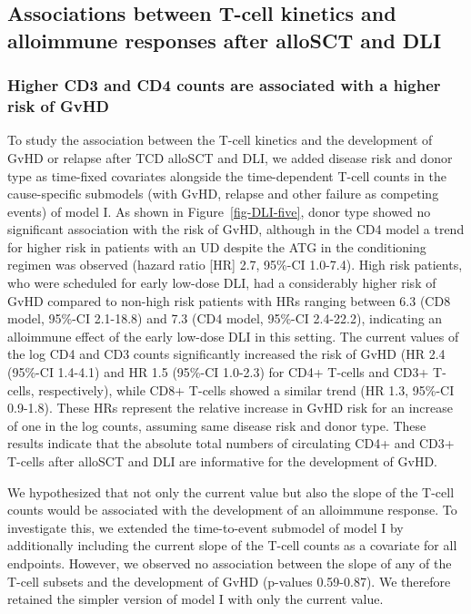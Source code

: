 \documentclass[
  letterpaper,
  paper=240mm:170mm,
  twoside=true,
  open=right,
  fontsize=10pt,
  pagesize=false,
  BCOR=15mm,
  DIV=14,
  headinclude=true,
  footinclude=false,
  headsepline=on]{scrbook}
\begin{document}
\subsection{Associations between T-cell kinetics and alloimmune
responses after alloSCT and
DLI}\label{associations-between-t-cell-kinetics-and-alloimmune-responses-after-allosct-and-dli}

\subsubsection{Higher CD3 and CD4 counts are associated with a higher
risk of
GvHD}\label{higher-cd3-and-cd4-counts-are-associated-with-a-higher-risk-of-gvhd}

To study the association between the T-cell kinetics and the development
of GvHD or relapse after TCD alloSCT and DLI, we added disease risk and
donor type as time-fixed covariates alongside the time-dependent T-cell
counts in the cause-specific submodels (with GvHD, relapse and other
failure as competing events) of model I. As shown in
Figure~\ref{fig-DLI-five}, donor type showed no significant association
with the risk of GvHD, although in the CD4 model a trend for higher risk
in patients with an UD despite the ATG in the conditioning regimen was
observed (hazard ratio {[}HR{]} 2.7, 95\%-CI 1.0-7.4). High risk
patients, who were scheduled for early low-dose DLI, had a considerably
higher risk of GvHD compared to non-high risk patients with HRs ranging
between 6.3 (CD8 model, 95\%-CI 2.1-18.8) and 7.3 (CD4 model, 95\%-CI
2.4-22.2), indicating an alloimmune effect of the early low-dose DLI in
this setting. The current values of the log CD4 and CD3 counts
significantly increased the risk of GvHD (HR 2.4 (95\%-CI 1.4-4.1) and
HR 1.5 (95\%-CI 1.0-2.3) for CD4+ T-cells and CD3+ T-cells,
respectively), while CD8+ T-cells showed a similar trend (HR 1.3,
95\%-CI 0.9-1.8). These HRs represent the relative increase in GvHD risk
for an increase of one in the log counts, assuming same disease risk and
donor type. These results indicate that the absolute total numbers of
circulating CD4+ and CD3+ T-cells after alloSCT and DLI are informative
for the development of GvHD.

We hypothesized that not only the current value but also the slope of
the T-cell counts would be associated with the development of an
alloimmune response. To investigate this, we extended the time-to-event
submodel of model I by additionally including the current slope of the
T-cell counts as a covariate for all endpoints. However, we observed no
association between the slope of any of the T-cell subsets and the
development of GvHD (p-values 0.59-0.87). We therefore retained the
simpler version of model I with only the current value.\\
\end{document}
